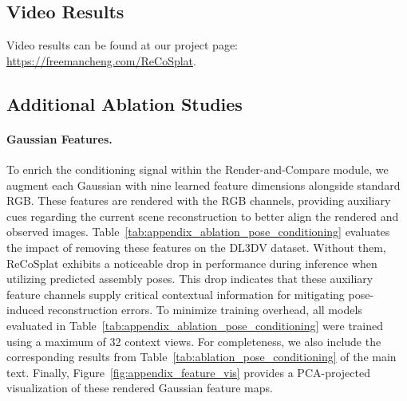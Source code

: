 \documentclass[runningheads]{llncs}
\begin{document}
\subsection{Video Results}

Video results can be found at our project page: \url{https://freemancheng.com/ReCoSplat}.

\subsection{Additional Ablation Studies}

\paragraph{\textbf{Gaussian Features.}} 
To enrich the conditioning signal within the Render-and-Compare module, we augment each Gaussian with nine learned feature dimensions alongside standard RGB. 
These features are rendered with the RGB channels, providing auxiliary cues regarding the current scene reconstruction to better align the rendered and observed images. 
Table~\ref{tab:appendix_ablation_pose_conditioning} evaluates the impact of removing these features on the DL3DV \cite{ling2024dl3dv} dataset. 
Without them, ReCoSplat exhibits a noticeable drop in performance during inference when utilizing predicted assembly poses. This drop indicates that these auxiliary feature channels supply critical contextual information for mitigating pose-induced reconstruction errors. 
To minimize training overhead, all models evaluated in Table~\ref{tab:appendix_ablation_pose_conditioning} were trained using a maximum of 32 context views. For completeness, we also include the corresponding results from Table~\ref{tab:ablation_pose_conditioning} of the main text. 
Finally, Figure~\ref{fig:appendix_feature_vis} provides a PCA-projected visualization of these rendered Gaussian feature maps.
\end{document}

